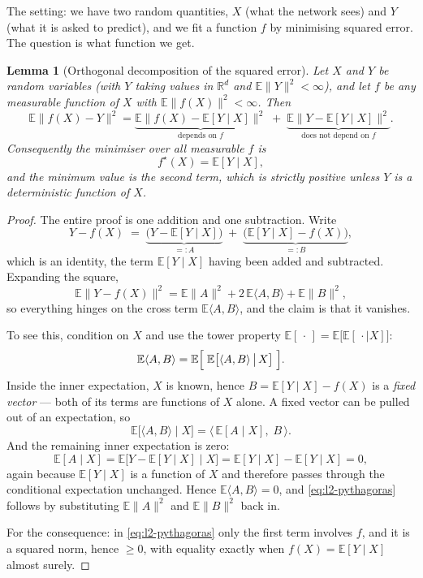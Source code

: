 \documentclass[11pt,a4paper]{report}
\newtheorem{lemma}[lemma]{Lemma}
\theoremstyle{definition}
\theoremstyle{remark}
\newcommand{\RR}{\mathbb R}
\newcommand{\EE}{\mathbb E}
\begin{document}
The setting: we have two random quantities, $X$ (what the network sees) and
$Y$ (what it is asked to predict), and we fit a function $f$ by minimising
squared error. The question is what function we get.

\begin{lemma}[Orthogonal decomposition of the squared error]
\label{lem:l2-projection}
Let $X$ and $Y$ be random variables (with $Y$ taking values in $\RR^d$ and
$\EE\|Y\|^2<\infty$), and let $f$ be any measurable function of $X$ with
$\EE\|f(X)\|^2<\infty$. Then
\begin{equation}
\label{eq:l2-pythagoras}
\EE\bigl\|f(X)-Y\bigr\|^2
=
\underbrace{\EE\bigl\|f(X)-\EE[Y\mid X]\bigr\|^2}_{\text{depends on }f}
\;+\;
\underbrace{\EE\bigl\|Y-\EE[Y\mid X]\bigr\|^2}_{\text{does not depend on }f} .
\end{equation}
Consequently the minimiser over all measurable $f$ is
\[
f^\star(X) = \EE[Y\mid X] ,
\]
and the minimum value is the second term, which is strictly positive unless
$Y$ is a deterministic function of $X$.
\end{lemma}

\begin{proof}
The entire proof is one addition and one subtraction. Write
\begin{equation}
\label{eq:l2-split}
Y - f(X)
\;=\;
\underbrace{\bigl(Y-\EE[Y\mid X]\bigr)}_{=:A}
\;+\;
\underbrace{\bigl(\EE[Y\mid X]-f(X)\bigr)}_{=:B} ,
\end{equation}
which is an identity, the term $\EE[Y\mid X]$ having been added and
subtracted. Expanding the square,
\[
\EE\|Y-f(X)\|^2 = \EE\|A\|^2 + 2\,\EE\langle A,B\rangle + \EE\|B\|^2 ,
\]
so everything hinges on the cross term $\EE\langle A,B\rangle$, and the
claim is that it vanishes.

To see this, condition on $X$ and use the tower property
$\EE[\,\cdot\,]=\EE\bigl[\EE[\,\cdot\mid X]\bigr]$:
\[
\EE\langle A,B\rangle = \EE\Bigl[\;\EE\bigl[\langle A,B\rangle \,\big|\, X\bigr]\;\Bigr] .
\]
Inside the inner expectation, $X$ is known, hence $B=\EE[Y\mid X]-f(X)$ is
a \emph{fixed vector} --- both of its terms are functions of $X$ alone. A
fixed vector can be pulled out of an expectation, so
\[
\EE\bigl[\langle A,B\rangle\mid X\bigr]
= \bigl\langle\, \EE[A\mid X],\;B \,\bigr\rangle .
\]
And the remaining inner expectation is zero:
\[
\EE[A\mid X] = \EE\bigl[Y-\EE[Y\mid X]\;\big|\;X\bigr]
= \EE[Y\mid X] - \EE[Y\mid X] = 0 ,
\]
again because $\EE[Y\mid X]$ is a function of $X$ and therefore passes
through the conditional expectation unchanged. Hence
$\EE\langle A,B\rangle=0$, and \eqref{eq:l2-pythagoras} follows by
substituting $\EE\|A\|^2$ and $\EE\|B\|^2$ back in.

For the consequence: in \eqref{eq:l2-pythagoras} only the first term
involves $f$, and it is a squared norm, hence $\ge0$, with equality exactly
when $f(X)=\EE[Y\mid X]$ almost surely.
\end{proof}
\end{document}
